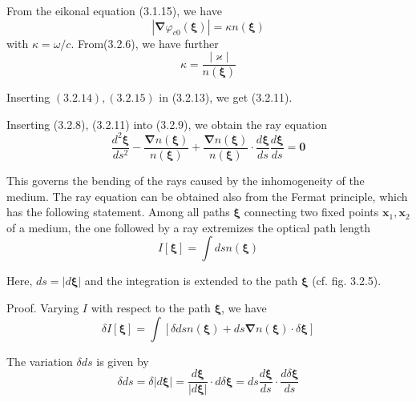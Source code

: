 \documentclass{article}
\begin{document}
From the eikonal equation (3.1.15), we have
$$
\begin{equation*}
\left|\boldsymbol{\nabla} \varphi_{c 0}(\boldsymbol{\xi})\right|=\kappa n(\boldsymbol{\xi}) \tag{3.2.14}
\end{equation*}
$$
with $\kappa=\omega / c$. From(3.2.6), we have further
$$
\begin{equation*}
\kappa=\frac{|\varkappa|}{n(\boldsymbol{\xi})} \tag{3.2.15}
\end{equation*}
$$

Inserting $(3.2 .14),(3.2 .15)$ in (3.2.13), we get (3.2.11).

Inserting (3.2.8), (3.2.11) into (3.2.9), we obtain the ray equation
$$
\begin{equation*}
\frac{d^{2} \boldsymbol{\xi}}{d s^{2}}-\frac{\boldsymbol{\nabla} n(\boldsymbol{\xi})}{n(\boldsymbol{\xi})}+\frac{\boldsymbol{\nabla} n(\boldsymbol{\xi})}{n(\boldsymbol{\xi})} \cdot \frac{d \boldsymbol{\xi}}{d s} \frac{d \boldsymbol{\xi}}{d s}=\mathbf{0} \tag{3.2.16}
\end{equation*}
$$

This governs the bending of the rays caused by the inhomogeneity of the medium.
The ray equation can be obtained also from the Fermat principle, which has the following statement. Among all paths $\boldsymbol{\xi}$ connecting two fixed points $\boldsymbol{x}_{1}, \boldsymbol{x}_{2}$ of a medium, the one followed by a ray extremizes the optical path length
$$
\begin{equation*}
I[\boldsymbol{\xi}]=\int d s n(\boldsymbol{\xi}) \tag{3.2.17}
\end{equation*}
$$

Here, $d s=|d \boldsymbol{\xi}|$ and the integration is extended to the path $\boldsymbol{\xi}$ (cf. fig. 3.2.5).

Proof. Varying $I$ with respect to the path $\boldsymbol{\xi}$, we have
$$
\begin{equation*}
\delta I[\boldsymbol{\xi}]=\int[\delta d s n(\boldsymbol{\xi})+d s \boldsymbol{\nabla} n(\boldsymbol{\xi}) \cdot \delta \boldsymbol{\xi}] \tag{3.2.18}
\end{equation*}
$$

The variation $\delta d s$ is given by
$$
\begin{equation*}
\delta d s=\delta|d \boldsymbol{\xi}|=\frac{d \boldsymbol{\xi}}{|d \boldsymbol{\xi}|} \cdot d \delta \boldsymbol{\xi}=d s \frac{d \boldsymbol{\xi}}{d s} \cdot \frac{d \delta \boldsymbol{\xi}}{d s} \tag{3.2.19}
\end{equation*}
$$
\end{document}

